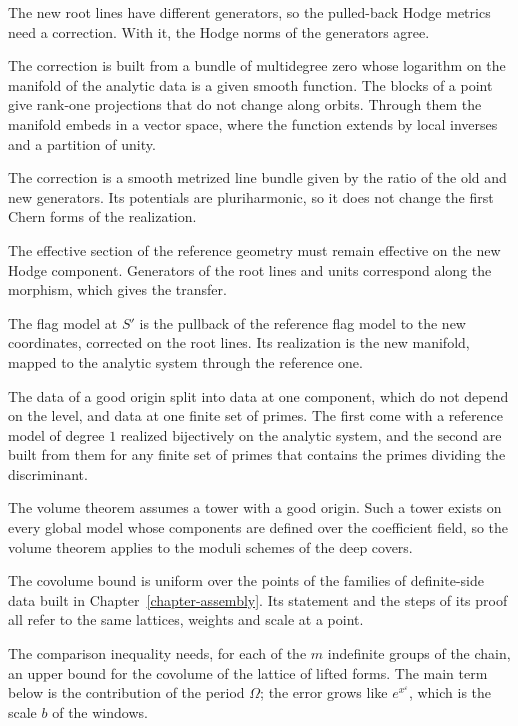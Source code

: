 The new root lines have different generators, so the pulled-back Hodge metrics need a correction. With it, the
Hodge norms of the generators agree.

The correction is built from a bundle of multidegree zero whose logarithm on the manifold of the analytic data is a
given smooth function. The blocks of a point give rank-one projections that do not change along orbits. Through them
the manifold embeds in a vector space, where the function extends by local inverses and a partition of unity.

The correction is a smooth metrized line bundle given by the ratio of the old and new generators. Its potentials
are pluriharmonic, so it does not change the first Chern forms of the realization.

The effective section of the reference geometry must remain effective on the new Hodge component. Generators of
the root lines and units correspond along the morphism, which gives the transfer.

The flag model at $S'$ is the pullback of the reference flag model to the new coordinates, corrected on the root
lines. Its realization is the new manifold, mapped to the analytic system through the reference one.

The data of a good origin split into data at one component, which do not depend on the level, and data
at one finite set of primes. The first come with a reference model of degree $1$ realized bijectively on
the analytic system, and the second are built from them for any finite set of primes that contains the
primes dividing the discriminant.

The volume theorem assumes a tower with a good origin. Such a tower exists on every global model
whose components are defined over the coefficient field, so the volume theorem applies to the moduli
schemes of the deep covers.

The covolume bound is uniform over the points of the families of definite-side data built
in Chapter~\ref{chapter-assembly}. Its statement and the steps of its proof all refer to
the same lattices, weights and scale at a point.

The comparison inequality needs, for each of the $m$ indefinite groups of the chain, an
upper bound for the covolume of the lattice of lifted forms. The main term below is the
contribution of the period $\Omega$; the error grows like $e^{x^{\varepsilon}}$, which is
the scale $b$ of the windows.

